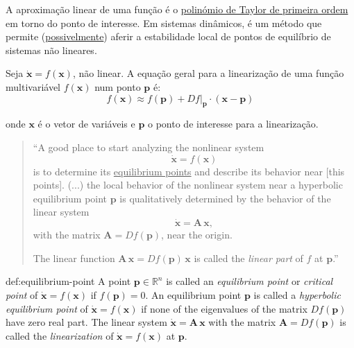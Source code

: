 \label{sec:linearisation}

\noindent A aproximação linear de uma função é o \underline{polinómio de Taylor de primeira ordem} em torno do ponto de interesse. Em sistemas dinâmicos, é um método que permite (\hyperref[def:equilibrium-point]{possivelmente}) aferir a estabilidade local de pontos de equilíbrio de sistemas não lineares.

{

\begin{mdframed}
    \noindent Seja $\pmb{\dot{x}} = f(\pmb{x})$, não linear. A equação geral para a linearização de uma função multivariável $f(\pmb{x})$ num ponto $\pmb{p}$ é:
    \vspace{-0.5em}
    $$
        f(\pmb{x}) \approx f(\pmb{p}) + \left.D f\right|_{\pmb{p}} \cdot (\pmb{x} - \pmb{p})
    $$
    
    \noindent onde $\pmb{x}$ é o vetor de variáveis e $\pmb{p}$ o ponto de interesse para a linearização.
\end{mdframed}
}

\begin{quote}
    \noindent ``A good place to start analyzing the nonlinear system 
    $$
        \pmb{\dot{x}} = f(\pmb{x}) 
    $$
    is to determine its \underline{equilibrium points} and describe its behavior near [this points]. (...) the local behavior of the nonlinear system near a hyperbolic equilibrium point $\pmb{p}$ is qualitatively determined by the behavior of the linear system
    $$
        \pmb{\dot{x}} = \pmb{A}\,\pmb{x},
    $$
    with the matrix $\pmb{A} = Df(\pmb{p})$, near the origin. 
    
    The linear function $\pmb{A}\, \pmb{x} = Df(\pmb{p})\, \pmb{x}$ is called the \textit{linear part} of $f$ at $\pmb{p}$.''\cite{Perko2013}
\end{quote}

\begin{theo}{def:equilibrium-point}\label{def:equilibrium-point}
    A point $\pmb{p} \in \mathbb{R}^n$ is called an \textit{equilibrium point} or \textit{critical point} of $\pmb{\dot{x}} = f(\pmb{x})$ if $f(\pmb{p}) = 0$. An equilibrium point $\pmb{p}$ is called a \textit{hyperbolic equilibrium point} of $\pmb{\dot{x}} = f(\pmb{x})$ if none of the eigenvalues of the matrix $Df(\pmb{p})$ have zero real part. The linear system $\pmb{\dot{x}} = \pmb{A}\,\pmb{x}$ with the matrix $\pmb{A} = D f(\pmb{p})$ is called the \textit{linearization} of $\pmb{\dot{x}} = f(\pmb{x})$ at $\pmb{p}$.
\end{theo}

